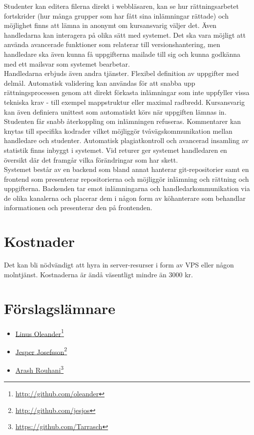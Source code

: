 \documentclass[11pt,oneside]{article}
\def\mybibliostyle{plain}
\def\mybibliocommand{}
\begin{document}
Studenter kan editera filerna direkt i webbläsaren, kan se hur rättningsarbetet fortskrider (hur många grupper som har fått sina inlämningar rättade) och möjlighet finns att lämna in anonymt om kursansvarig väljer det.
Även handledarna kan interagera på olika sätt med systemet. Det ska vara möjligt att använda avancerade funktioner som relaterar till versionshantering, men handledare ska även kunna få uppgifterna mailade till sig och kunna godkänna med ett mailsvar som systemet bearbetar. \\

Handledarna erbjuds även andra tjänster. Flexibel definition av uppgifter med delmål. Automatisk validering kan användas för att snabba upp rättningsprocessen genom att direkt förkasta inlämningar som inte uppfyller vissa tekniska krav - till exempel mappstruktur eller maximal radbredd. Kursansvarig kan även definiera unittest som automatiskt körs när uppgiften lämnas in. Studenten får snabb återkoppling om inlämningen refuseras. Kommentarer kan knytas till specifika kodrader vilket möjliggör tvåvägskommunikation mellan handledare och studenter. Automatisk plagiatkontroll och avancerad insamling av statistik finns inbyggt i systemet. Vid returer ger systemet handledaren en översikt där det framgår vilka förändringar som har skett. \\

Systemet består av en backend som bland annat hanterar git-repositorier samt en frontend som presenterar repositorierna och möjliggör inlämning och rättning och uppgifterna. Backenden tar emot inlämningarna och handledarkommunikation via de olika kanalerna och placerar dem i någon form av köhanterare som behandlar informationen och presenterar den på frontenden.
\section{Kostnader}
\label{kostnader}

Det kan bli nödvändigt att hyra in server-resurser i form av VPS eller någon molntjänst. Kostnaderna är ändå väsentligt mindre än 3000 kr.

\section{Förslagslämnare}
\label{frslagslmnare}

\begin{itemize}

\item \href{http://github.com/oleander}{Linus Oleander}\footnote{\href{http://github.com/oleander}{http://github.com/oleander}}
\item \href{http://github.com/jesjos}{Jesper Josefsson}\footnote{\href{http://github.com/jesjos}{http://github.com/jesjos}}
\item \href{https://github.com/Tarrasch}{Arash Rouhani}\footnote{\href{https://github.com/Tarrasch}{https://github.com/Tarrasch}}
\end{itemize}


\mybibliocommand
\end{document}
